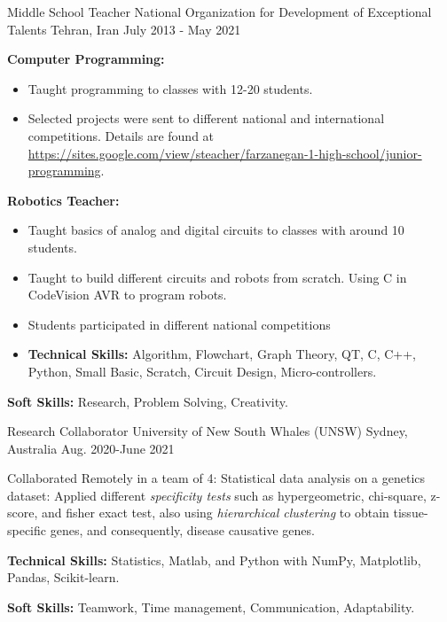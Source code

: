 \begin{cventries}
{\begin{cvitems}
      \end{cvitems}
    } 
\cventry
    {Middle School Teacher}
    {National Organization for Development of Exceptional Talents}
    {Tehran, Iran}
    {July 2013 -  May 2021}
    {
      \begin{cvitems} %
        \item{\textbf{Computer Programming:}}
        \begin{itemize}[label= - ]
          \item{Taught programming to classes with 12-20 students.}
          \item{Selected projects were sent to different national and international competitions. Details are found at \href{https://sites.google.com/view/steacher/farzanegan-1-high-school/junior-programming}{https://sites.google.com/view/steacher/farzanegan-1-high-school/junior-programming}.}
          \end{itemize}
        \item{\textbf{Robotics Teacher:}}
        \begin{itemize}[label= - ]
          \item{Taught basics of analog and digital circuits to classes with around 10 students.}
          \item{Taught to build different circuits and robots from scratch. Using C in CodeVision AVR to program robots.}
          \item{Students participated in different national competitions}
        \item {\textbf{Technical Skills:} Algorithm, Flowchart, Graph Theory, QT, C, C++, Python, Small Basic, Scratch, Circuit Design, Micro-controllers.}
        \end{itemize}
        \item {\textbf{Soft Skills:} Research, Problem Solving, Creativity.}
      \end{cvitems}
    }
    
  \cventry
{Research Collaborator}  %
    {University of New South Whales (UNSW)} %
    {Sydney, Australia} %
    {Aug. 2020-June 2021} %
    {
      \begin{cvitems} %
        \item{Collaborated Remotely in a team of 4: Statistical data analysis on a genetics dataset: Applied different \textit{specificity tests} such as hypergeometric, chi-square, z-score, and fisher exact test, also using \textit{hierarchical clustering} to obtain tissue-specific genes, and consequently, disease causative genes.}
        \item {\textbf{Technical Skills:} Statistics, Matlab, and Python with NumPy, Matplotlib, Pandas, Scikit-learn.}
        \item {\textbf{Soft Skills:} Teamwork, Time management, Communication, Adaptability.}
      \end{cvitems}
    }
 

\end{cventries}
